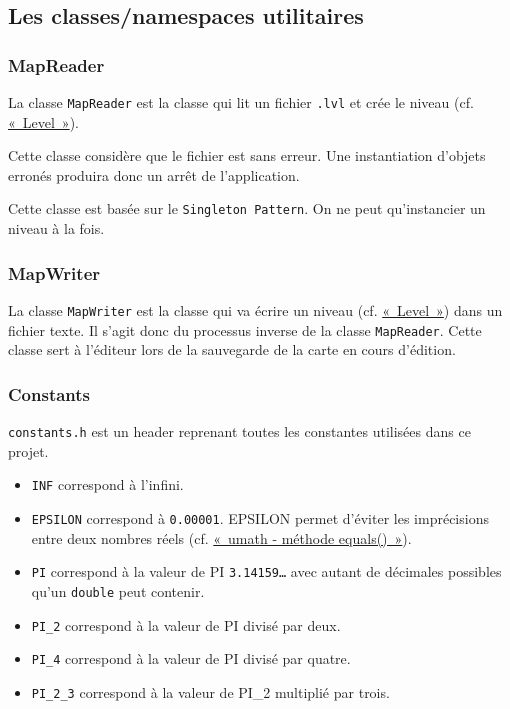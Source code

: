 \documentclass[]{report}
\begin{document}
\subsection{Les classes/namespaces utilitaires}

\subsubsection{MapReader}

La classe \texttt{MapReader} est la classe qui lit un fichier \texttt{.lvl} 
et crée le niveau (cf. \hyperref[Level]{«~Level~»}).

Cette classe considère que le fichier est sans erreur. Une instantiation d'objets
erronés produira donc un arrêt de l'application.

Cette classe est basée sur le \texttt{Singleton Pattern}. On ne peut qu’instancier un niveau
à la fois.

\subsubsection{MapWriter}

La classe \texttt{MapWriter} est la classe qui va écrire un niveau (cf. \hyperref[Level]{«~Level~»}) 
dans un fichier texte. Il s’agit donc du processus inverse de la classe
\texttt{MapReader}. Cette classe sert à l’éditeur lors de la sauvegarde de la
carte en cours d’édition.

\subsubsection{\label{Constants}Constants}

\texttt{constants.h} est un header reprenant toutes les constantes utilisées
dans ce projet. 

\begin{itemize}
    \item \texttt{INF} correspond à l'infini.
    \item \texttt{EPSILON} correspond à \texttt{0.00001}. EPSILON permet
        d'éviter les imprécisions entre deux nombres réels (cf. \hyperref[equals]{«~umath - méthode equals()~»}).
    \item \texttt{PI} correspond à la valeur de PI \texttt{3.14159\dots} avec
        autant de décimales possibles qu'un \texttt{double} peut contenir.
    \item \texttt{PI\_2} correspond à la valeur de PI divisé par deux.
    \item \texttt{PI\_4} correspond à la valeur de PI divisé par quatre.
    \item \texttt{PI\_2\_3} correspond à la valeur de PI\_2 multiplié par trois.
\end{itemize}
\end{document}
